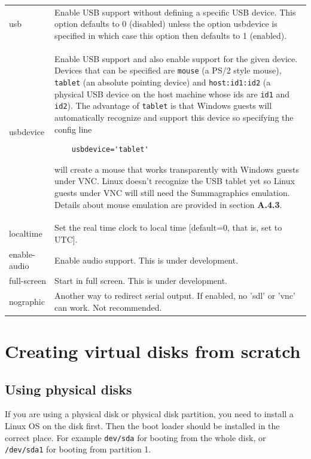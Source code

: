 \documentclass[11pt,twoside,final,openright]{report}
\begin{document}
\begin{tabular}{lp{10cm}}

usb &           Enable USB support without defining a specific USB device.
This option defaults to 0 (disabled) unless the option usbdevice is
specified in which case this option then defaults to 1 (enabled).\\

usbdevice &     Enable USB support and also enable support for the given
device.  Devices that can be specified are {\small {\tt mouse}} (a PS/2 style
mouse), {\small {\tt tablet}} (an absolute pointing device) and
{\small {\tt host:id1:id2}} (a physical USB device on the host machine whose
ids are {\small {\tt id1}} and {\small {\tt id2}}).  The advantage
of {\small {\tt tablet}} is that Windows guests will automatically recognize
and support this device so specifying the config line

{\small
\begin{verbatim}
    usbdevice='tablet'
\end{verbatim}
}

will create a mouse that works transparently with Windows guests under VNC.
Linux doesn't recognize the USB tablet yet so Linux guests under VNC will
still need the Summagraphics emulation.
Details about mouse emulation are provided in section \textbf{A.4.3}.\\

localtime &     Set the real time clock to local time [default=0, that is, set to UTC].\\

enable-audio &  Enable audio support. This is under development.\\

full-screen     & Start in full screen. This is under development.\\

nographic &     Another way to redirect serial output. If enabled, no 'sdl' or 'vnc' can work. Not recommended.\\

\end{tabular}


\section{Creating virtual disks from scratch}
\subsection{Using physical disks}
If you are using a physical disk or physical disk partition, you need to install a Linux OS on the disk first. Then the boot loader should be installed in the correct place. For example {\small {\tt dev/sda}} for booting from the whole disk, or {\small {\tt /dev/sda1}} for booting from partition 1.
\end{document}
